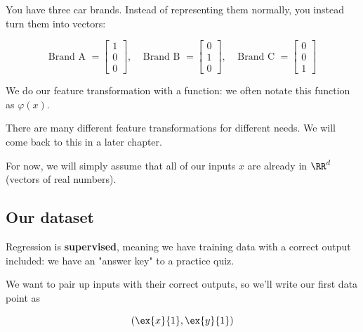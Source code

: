         \miniex You have three car brands. Instead of representing them normally, you instead turn them into vectors: 
        
        \begin{equation}
            \text{Brand A }=
            \begin{bmatrix}
              1 \\ 0 \\ 0
            \end{bmatrix},
            \;\;\;\;
            \text{Brand B }=
            \begin{bmatrix}
              0 \\ 1 \\ 0
            \end{bmatrix},
            \;\;\;\;
            \text{Brand C }=
            \begin{bmatrix}
              0 \\ 0 \\ 1
            \end{bmatrix}
        \end{equation}
        
        We do our feature transformation with a function: we often notate this function as $\varphi(x)$. 
        
        There are many different feature transformations for different needs. We will come back to this in a later chapter. 
        
        For now, we will simply assume that all of our inputs $x$ are already in $\RR^d$ (vectors of real numbers).
        
    \subsection{Our dataset}
    
        Regression is \textbf{supervised}, meaning we have training data with a correct output included: we have an "answer key" to a practice quiz.
        
        We want to pair up inputs with their correct outputs, so we'll write our first data point as 
        
        \begin{equation*}
            \left( \ex{x}{1}, \ex{y}{1} \right)
        \end{equation*}
        
